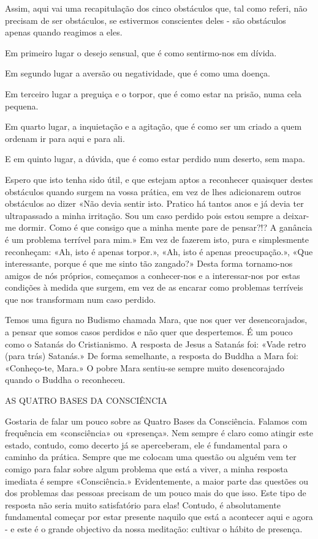 Assim, aqui vai uma recapitulação dos cinco obstáculos que, tal como
referi, não precisam de ser obstáculos, se estivermos conscientes deles
- são obstáculos apenas quando reagimos a eles.

Em primeiro lugar o desejo sensual, que é como sentirmo-nos em dívida.

Em segundo lugar a aversão ou negatividade, que é como uma doença.

Em terceiro lugar a preguiça e o torpor, que é como estar na prisão,
numa cela pequena.

Em quarto lugar, a inquietação e a agitação, que é como ser um criado a
quem ordenam ir para aqui e para ali.

E em quinto lugar, a dúvida, que é como estar perdido num deserto, sem
mapa.

Espero que isto tenha sido útil, e que estejam aptos a reconhecer
quaisquer destes obstáculos quando surgem na vossa prática, em vez de
lhes adicionarem outros obstáculos ao dizer «Não devia sentir isto.
Pratico há tantos anos e já devia ter ultrapassado a minha irritação.
Sou um caso perdido pois estou sempre a deixar-me dormir. Como é que
consigo que a minha mente pare de pensar?!? A ganância é um problema
terrível para mim.» Em vez de fazerem isto, pura e simplesmente
reconheçam: «Ah, isto é apenas torpor.», «Ah, isto é apenas
preocupação.», «Que interessante, porque é que me sinto tão zangado?»
Desta forma tornamo-nos amigos de nós próprios, começamos a conhecer-nos
e a interessar-nos por estas condições à medida que surgem, em vez de as
encarar como problemas terríveis que nos transformam num caso perdido.

Temos uma figura no Budismo chamada Mara, que nos quer ver
desencorajados, a pensar que somos casos perdidos e não quer que
despertemos. É um pouco como o Satanás do Cristianismo. A resposta de
Jesus a Satanás foi: «Vade retro (para trás) Satanás.» De forma
semelhante, a resposta do Buddha a Mara foi: «Conheço-te, Mara.» O pobre
Mara sentiu-se sempre muito desencorajado quando o Buddha o reconheceu.

AS QUATRO BASES DA CONSCIÊNCIA

Gostaria de falar um pouco sobre as Quatro Bases da Consciência. Falamos
com frequência em «consciência» ou «presença». Nem sempre é claro como
atingir este estado, contudo, como decerto já se aperceberam, ele é
fundamental para o caminho da prática. Sempre que me colocam uma questão
ou alguém vem ter comigo para falar sobre algum problema que está a
viver, a minha resposta imediata é sempre «Consciência.» Evidentemente,
a maior parte das questões ou dos problemas das pessoas precisam de um
pouco mais do que isso. Este tipo de resposta não seria muito
satisfatório para elas! Contudo, é absolutamente fundamental começar por
estar presente naquilo que está a acontecer aqui e agora - e este é o
grande objectivo da nossa meditação: cultivar o hábito de presença.

